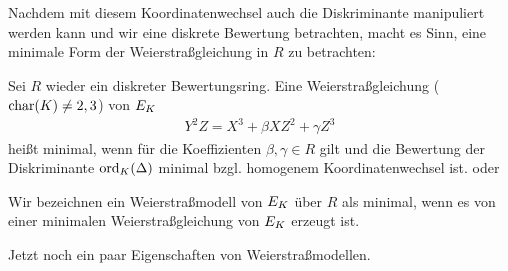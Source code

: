 \documentclass[german]{scrreprt}
\begin{document}
Nachdem mit diesem Koordinatenwechsel auch die Diskriminante
manipuliert werden kann und wir eine diskrete Bewertung betrachten,
macht es Sinn, eine minimale Form der Weierstraßgleichung in $R$ zu
betrachten:
\begin{Definition}
  Sei $R$ wieder ein diskreter Bewertungsring.
  Eine Weierstraßgleichung ($\operatorname{char}(K)\neq2,3$) von $E_{K}$
  \begin{gather*}
    Y^2Z = X^3 + \beta XZ^2 + \gamma Z^3
  \end{gather*}
  heißt minimal, wenn für die Koeffizienten $\beta, \gamma\in R$ gilt
  und die Bewertung der Diskriminante $\operatorname{ord}_{K}(\Delta)$ minimal
  bzgl. homogenem Koordinatenwechsel ist.
  \cite[Chapter 1.5, S.\,22]{neron} oder
  \cite[Chapter VII.1]{silverman}

  Wir bezeichnen ein Weierstraßmodell von $E_{K}$ über $R$ als minimal,
  wenn es von einer minimalen Weierstraßgleichung von $E_{K}$ erzeugt
  ist.
\end{Definition}

Jetzt noch ein paar Eigenschaften von Weierstraßmodellen.
\end{document}

